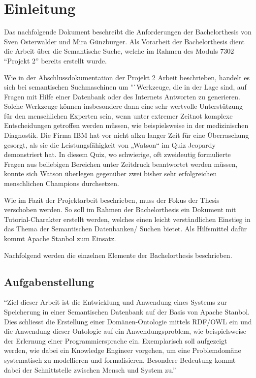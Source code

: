 \chapter{Einleitung}
\label{chap:einleitung}

Das nachfolgende Dokument beschreibt die Anforderungen der Bachelorthesis von Sven Osterwalder und Mira Günzburger. Als Vorarbeit der Bachelorthesis dient die Arbeit über die Semantische Suche, welche im Rahmen des Moduls 7302 "`Projekt 2"' bereits erstellt wurde.

Wie in der Abschlussdokumentation der Projekt 2 Arbeit beschrieben, handelt es sich bei semantischen  Suchmaschinen um "`Werkzeuge, die in der Lage sind, auf Fragen mit Hilfe einer Datenbank oder des Internets Antworten zu generieren. Solche Werkzeuge können insbesondere dann eine sehr wertvolle Unterstützung für den menschlichen Experten sein, wenn unter extremer Zeitnot komplexe Entscheidungen getroffen werden müssen, wie beispielsweise in der medizinischen Diagnostik. Die Firma IBM hat vor nicht allzu langer Zeit für eine Überraschung gesorgt, als sie die Leistungsfähigkeit von „Watson“ im Quiz Jeopardy demonstriert hat. In diesem Quiz, wo schwierige, oft zweideutig formulierte Fragen aus beliebigen Bereichen unter Zeitdruck beantwortet werden müssen, konnte sich Watson überlegen gegenüber zwei bisher sehr erfolgreichen menschlichen Champions durchsetzen.
\cite{projekt2Doc}

Wie im Fazit der Projektarbeit beschrieben, muss der Fokus der Thesis verschoben werden. So soll im Rahmen der Bachelorthesis ein Dokument mit Tutorial-Charakter erstellt werden, welches einen leicht verständlichen Einstieg in das Thema der Semantischen Datenbanken/ Suchen bietet. Als Hilfsmittel dafür kommt Apache Stanbol zum Einsatz.

Nachfolgend werden die einzelnen Elemente der Bachelorthesis beschrieben.

\section{Aufgabenstellung}
\label{sec:Aufgabenstellung}
"`Ziel dieser Arbeit ist die Entwicklung und Anwendung eines Systems zur Speicherung in einer Semantischen Datenbank auf der Basis von Apache Stanbol. Dies schliesst die Erstellung einer Domänen-Ontologie mittels RDF/OWL ein und die Anwendung dieser Ontologie auf ein Anwendungsproblem, wie beispielsweise der Erlernung einer Programmiersprache ein. Exemplarisch soll aufgezeigt werden, wie dabei ein Knowledge Engineer vorgehen, um eine Problemdomäne systematisch zu modellieren und formalisieren. Besondere Bedeutung kommt dabei der Schnittstelle zwischen Mensch und System zu."'~\cite{Aufgabenstellung}

